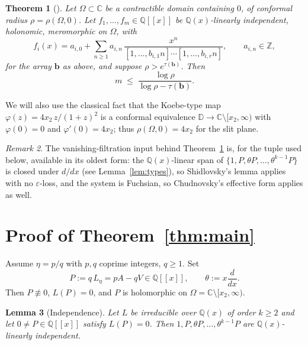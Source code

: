 \documentclass[11pt]{amsart}
\newtheorem{theorem}{Theorem}[section]
\newtheorem{lemma}[theorem]{Lemma}
\theoremstyle{definition}
\theoremstyle{remark}
\newtheorem{remark}[theorem]{Remark}
\newcommand{\Q}{\mathbb{Q}}
\newcommand{\Z}{\mathbb{Z}}
\newcommand{\C}{\mathbb{C}}
\newcommand{\D}{\mathbb{D}}
\newcommand{\lcm}[1]{[1,\dots,#1]}
\begin{document}
\begin{theorem}[{\cite[Theorem~2.7.1; see also Theorem~7.0.1 and the
holonomic relaxation stated there]{CDT}}]\label{thm:cdt}
Let $\Omega\subset\C$ be a contractible domain containing $0$, of
conformal radius $\rho=\rho(\Omega,0)$. Let $f_1,\dots,f_m\in\Q[[x]]$ be
$\Q(x)$-linearly independent, holonomic, meromorphic on $\Omega$, with
\[
f_i(x)=a_{i,0}+\sum_{n\ge1}a_{i,n}\,
\frac{x^n}{\lcm{b_{i,1}n}\cdots\lcm{b_{i,r}n}},\qquad a_{i,n}\in\Z,
\]
for the array $\mathbf b$ as above, and suppose
$\rho>e^{\tau(\mathbf b)}$. Then
\[
m\;\le\;\frac{\log\rho}{\log\rho-\tau(\mathbf b)}.
\]
\end{theorem}

We will also use the classical fact that the Koebe-type map
$\varphi(z)=4x_2\,z/(1+z)^2$ is a conformal equivalence
$\D\to\C\setminus[x_2,\infty)$ with $\varphi(0)=0$ and
$\varphi'(0)=4x_2$; thus $\rho(\Omega,0)=4x_2$ for the slit plane.

\begin{remark}\label{rem:shidlovsky}
The vanishing-filtration input behind Theorem~\ref{thm:cdt} is, for the
tuple used below, available in its oldest form: the $\Q(x)$-linear span
of $\{1,P,\theta P,\dots,\theta^{k-1}P\}$ is closed under $d/dx$
(see Lemma~\ref{lem:types}), so Shidlovsky's lemma
\cite[Theorem~3.2.8]{CDT} applies with no $\varepsilon$-loss, and the
system is Fuchsian, so Chudnovsky's effective form
\cite[Theorem~3.2.10, Remark~3.2.12]{CDT} applies as well.
\end{remark}

\section{Proof of Theorem~\ref{thm:main}}

Assume $\eta=p/q$ with $p,q$ coprime integers, $q\ge1$. Set
\[
P:=q\,L_\eta=pA-qV\in\Q[[x]],\qquad \theta:=x\frac{d}{dx}.
\]
Then $P\not\equiv0$, $L(P)=0$, and $P$ is holomorphic on
$\Omega=\C\setminus[x_2,\infty)$.

\begin{lemma}[Independence]\label{lem:indep}
Let $L$ be irreducible over $\Q(x)$ of order $k\ge2$ and let
$0\ne P\in\Q[[x]]$ satisfy $L(P)=0$. Then
$1,P,\theta P,\dots,\theta^{k-1}P$ are $\Q(x)$-linearly independent.
\end{lemma}
\end{document}
